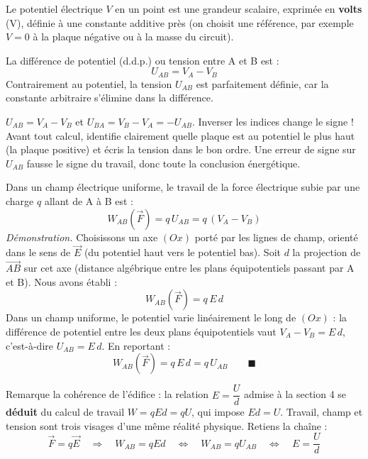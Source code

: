 \documentclass[11pt]{article}
\newcommand{\cle}[1]{{\popxbold\color{popdark}#1}}
\newcounter{popsec}
\newcounter{popsub}
\newcommand{\courssub}[1]{%
  \stepcounter{popsub}%
  \par\vspace{9pt}\noindent{\popxbold\fontsize{11.5}{13}\selectfont\color{popink}{\color{poporange}\thepopsec.\thepopsub}\hspace{6pt}#1}\par\nopagebreak\vspace{4pt}
}
\begin{document}
\begin{definition}
Le \cle{potentiel électrique} $V$ en un point est une grandeur scalaire, exprimée en \textbf{volts} (V), définie à une constante additive près (on choisit une référence, par exemple $V = 0$ à la plaque négative ou à la masse du circuit).

La \cle{différence de potentiel} (d.d.p.) ou \cle{tension} entre A et B est :
\[ U_{AB} = V_A - V_B \]
Contrairement au potentiel, la tension $U_{AB}$ est parfaitement définie, car la constante arbitraire s'élimine dans la différence.
\end{definition}

\begin{attention}
$U_{AB} = V_A - V_B$ et $U_{BA} = V_B - V_A = -U_{AB}$. Inverser les indices change le signe ! Avant tout calcul, identifie clairement quelle plaque est au potentiel le plus haut (la plaque positive) et écris la tension dans le bon ordre. Une erreur de signe sur $U_{AB}$ fausse le signe du travail, donc toute la conclusion énergétique.
\end{attention}

\courssub{Théorème : $W_{AB}(\vec{F}) = q\,U_{AB}$}

\begin{propriete}
Dans un champ électrique uniforme, le travail de la force électrique subie par une charge $q$ allant de A à B est :
\[ W_{AB}(\vec{F}) = q\,U_{AB} = q\,(V_A - V_B) \]
\emph{Démonstration.} Choisissons un axe $(Ox)$ porté par les lignes de champ, orienté dans le sens de $\vec{E}$ (du potentiel haut vers le potentiel bas). Soit $d$ la projection de $\overrightarrow{AB}$ sur cet axe (distance algébrique entre les plans équipotentiels passant par A et B). Nous avons établi :
\[ W_{AB}(\vec{F}) = q\,E\,d \]
Dans un champ uniforme, le potentiel varie linéairement le long de $(Ox)$ : la différence de potentiel entre les deux plans équipotentiels vaut $V_A - V_B = E\,d$, c'est-à-dire $U_{AB} = E\,d$. En reportant :
\[ W_{AB}(\vec{F}) = q\,E\,d = q\,U_{AB} \qquad \blacksquare \]
\end{propriete}

\begin{aretenir}[Boucle pédagogique : la relation $E = U/d$ retrouvée]
Remarque la cohérence de l'édifice : la relation $E = \dfrac{U}{d}$ admise à la section 4 se \textbf{déduit} du calcul de travail $W = qEd = qU$, qui impose $Ed = U$. Travail, champ et tension sont trois visages d'une même réalité physique. Retiens la chaîne :
\[ \vec{F} = q\vec{E} \quad\Longrightarrow\quad W_{AB} = qEd \quad\Longleftrightarrow\quad W_{AB} = qU_{AB} \quad\Longleftrightarrow\quad E = \frac{U}{d} \]
\end{aretenir}
\end{document}
